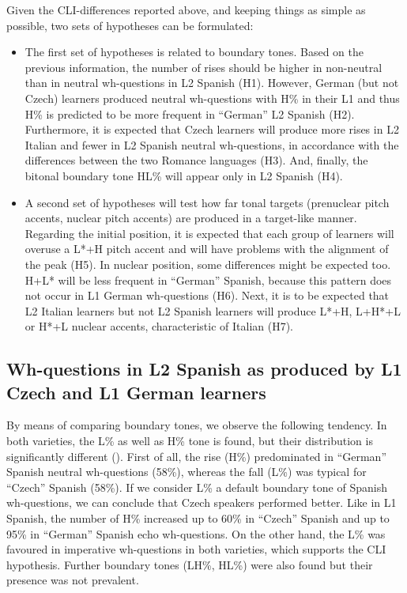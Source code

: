 Given the CLI-differences reported above, and keeping things as simple as possible, two sets of hypotheses can be formulated:

\begin{itemize}
\item
The first set of hypotheses is related to boundary tones. Based on the previous information, the number of rises should be higher in non-neutral than in neutral wh-questions in L2 Spanish ({H1}). However, German (but not Czech) learners produced neutral wh-questions with H\% in their L1 and thus H\% is predicted to be more frequent in “German” L2 Spanish ({H2}). Furthermore, it is expected that Czech learners will produce more rises in L2 Italian and fewer in L2 Spanish neutral wh-questions, in accordance with the differences between the two Romance languages ({H3}). And, finally, the bitonal boundary tone HL\% will appear only in L2 Spanish ({H4}).

\item
A second set of hypotheses will test how far tonal targets (prenuclear pitch accents, nuclear pitch accents) are produced in a target-like manner. Regarding the initial position, it is expected that each group of learners will overuse a L*+H pitch accent and will have problems with the alignment of the peak ({H5}). In nuclear position, some differences might be expected too. H+L* will be less frequent in “German” Spanish, because this pattern does not occur in L1 German wh-questions ({H6}). Next, it is to be expected that L2 Italian learners but not L2 Spanish learners will produce L*+H, L+H*+L or H*+L nuclear accents, characteristic of Italian ({H7}).

\end{itemize}

\subsection{Wh-questions in L2 Spanish as produced by L1 Czech and L1 German learners}\label{sec:4.4.2}

By means of comparing boundary tones, we observe the following tendency. In both varieties, the L\% as well as H\% tone is found, but their distribution is significantly different (). First of all, the rise (H\%) predominated in “German” Spanish neutral wh-questions (58\%), whereas the fall (L\%) was typical for “Czech” Spanish (58\%). If we consider L\% a default boundary tone of Spanish wh-questions, we can conclude that Czech speakers performed better. Like in L1 Spanish, the number of H\% increased up to 60\% in “Czech” Spanish and up to 95\% in “German” Spanish echo wh-questions. On the other hand, the L\% was favoured in imperative wh-questions in both varieties, which supports the CLI hypothesis. Further boundary tones (LH\%, HL\%) were also found but their presence was not prevalent.

